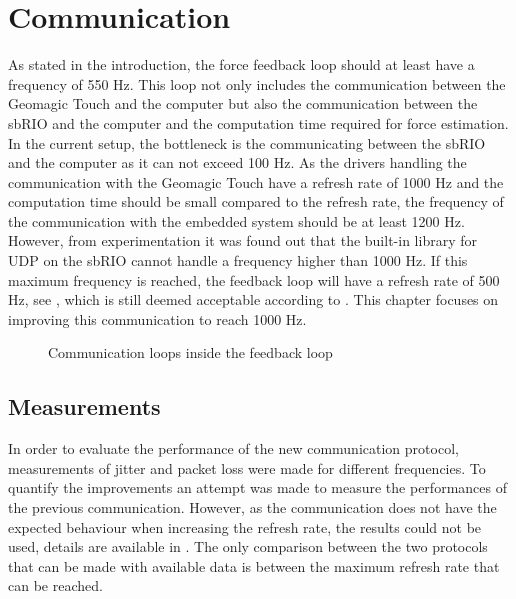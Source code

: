 \chapter{Communication}\label{cha:communication}

As stated in the introduction, the force feedback loop should at least have a frequency of 550 Hz. This loop not only includes the communication between the Geomagic Touch and the computer but also the communication between the sbRIO and the computer and the computation time required for force estimation. In the current setup, the bottleneck is the communicating between the sbRIO and the computer as it can not exceed 100 Hz. As the drivers handling the communication with the Geomagic Touch have a refresh rate of 1000 Hz and the computation time should be small compared to the refresh rate, the frequency of the communication with the embedded system should be at least 1200 Hz. However, from experimentation it was found out that the built-in library for UDP on the sbRIO cannot handle a frequency higher than 1000 Hz. If this maximum frequency is reached, the feedback loop will have a refresh rate of 500 Hz, see , which is still deemed acceptable according to \cite{coles2011role}.  This chapter focuses on improving this communication to reach 1000 Hz.

\begin{figure}[H]
	\centering
	
	\caption{Communication loops inside the feedback loop}
	\label{fig:speed_graph}
\end{figure}











\section{Measurements}

In order to evaluate the performance of the new communication protocol, measurements of jitter and packet loss were made for different frequencies. To quantify the improvements an attempt was made to measure the performances of the previous communication. However, as the communication does not have the expected behaviour when increasing the refresh rate, the results could not be used, details are available in . The only comparison between the two protocols that can be made with available data is between the maximum refresh rate that can be reached.

